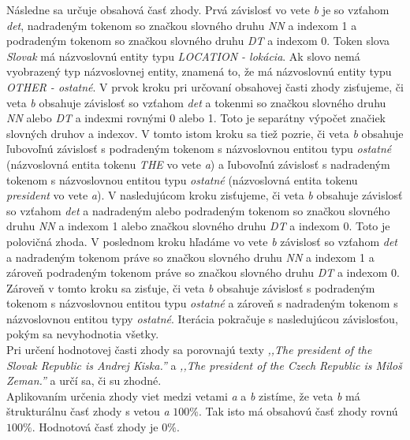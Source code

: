 Následne sa určuje obsahová časť zhody. Prvá závislosť vo vete \textit{b} je so vzťahom \textit{det}, nadradeným tokenom so značkou slovného druhu \textit{NN} a indexom 1 a podradeným tokenom so značkou slovného druhu \textit{DT} a indexom 0. Token slova \textit{Slovak} má názvoslovnú entity typu \textit{LOCATION - lokácia}. Ak slovo nemá vyobrazený typ názvoslovnej entity, znamená to, že má názvoslovnú entity typu \textit{OTHER - ostatné}. V prvok kroku pri určovaní obsahovej časti zhody zisťujeme, či veta \textit{b} obsahuje závislosť so vzťahom \textit{det} a tokenmi so značkou slovného druhu \textit{NN} alebo \textit{DT} a indexmi rovnými 0 alebo 1. Toto je separátny výpočet značiek slovných druhov a indexov. V tomto istom kroku sa tiež pozrie, či veta \textit{b} obsahuje ľubovoľnú závislosť s podradeným tokenom s názvoslovnou entitou typu \textit{ostatné} (názvoslovná entita tokenu \textit{THE} vo vete \textit{a}) a ľubovoľnú závislosť s nadradeným tokenom s názvoslovnou entitou typu \textit{ostatné} (názvoslovná entita tokenu \textit{president} vo vete \textit{a}). V nasledujúcom kroku zisťujeme, či veta \textit{b} obsahuje závislosť so vzťahom \textit{det} a nadradeným alebo podradeným tokenom so značkou slovného druhu \textit{NN} a indexom 1 alebo značkou slovného druhu \textit{DT} a indexom 0. Toto je polovičná zhoda. V poslednom kroku hľadáme vo vete \textit{b} závislosť so vzťahom \textit{det} a nadradeným tokenom práve so značkou slovného druhu \textit{NN} a indexom 1 a zároveň podradeným tokenom práve so značkou slovného druhu \textit{DT} a indexom 0. Zároveň v tomto kroku sa zisťuje, či veta \textit{b} obsahuje závislosť s podradeným tokenom s názvoslovnou entitou typu \textit{ostatné} a zároveň s nadradeným tokenom s názvoslovnou entitou typy \textit{ostatné}. Iterácia pokračuje s nasledujúcou závislosťou, pokým sa nevyhodnotia všetky. \\

Pri určení hodnotovej časti zhody sa porovnajú texty \textit{,,The president of the Slovak Republic is Andrej Kiska.''} a \textit{,,The president of the Czech Republic is Miloš Zeman.''} a určí sa, či su zhodné. \\

Aplikovaním určenia zhody viet medzi vetami \textit{a} a \textit{b} zistíme, že veta \textit{b} má štrukturálnu časť zhody s vetou \textit{a} $100\%$. Tak isto má obsahovú časť zhody rovnú $100\%$. Hodnotová časť zhody je $0\%$.

